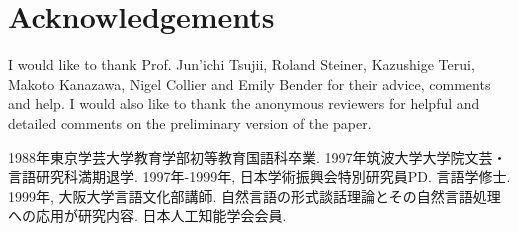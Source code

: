 \section*{Acknowledgements}
I would like to thank Prof. Jun'ichi Tsujii, Roland Steiner, Kazushige Terui, Makoto Kanazawa, Nigel Collier and Emily Bender for their advice, comments and help.
I would also like to thank the anonymous reviewers for helpful and detailed comments on the preliminary version of the paper.





\begin{biography}

\biotitle{}

{
1988年東京学芸大学教育学部初等教育国語科卒業. 1997年筑波大学大学院文芸・言語研究科満期退学. 1997年-1999年, 日本学術振興会特別研究員PD. 言語学修士.
1999年, 大阪大学言語文化部講師. 自然言語の形式談話理論とその自然言語処理への応用が研究内容. 日本人工知能学会会員.
}


\end{biography}
             


